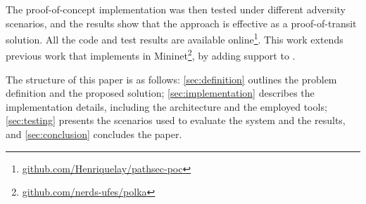 The proof-of-concept implementation was then tested under different adversity scenarios, and the results show that the approach is effective as a proof-of-transit solution. All the code and test results are available online\footnote{\url{github.com/Henriquelay/pathsec-poc}}. 
This work extends previous work that implements \polka in Mininet\cite{polkap4}\footnote{\url{github.com/nerds-ufes/polka}}, by adding support to \pathsec.




The structure of this paper is as follows: \autoref{sec:definition} outlines the problem definition and the proposed solution; \autoref{sec:implementation} describes the implementation details, including the architecture and the employed tools; \autoref{sec:testing} presents the scenarios used to evaluate the system and the results, and \autoref{sec:conclusion} concludes the paper.

